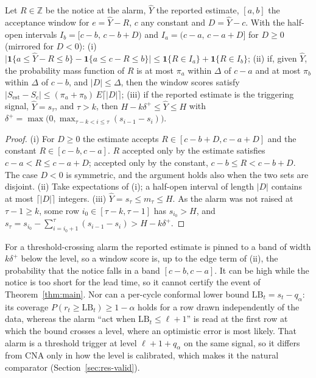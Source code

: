 \begin{proposition}\label{prop:window}
Let $R\in\mathbb Z$ be the notice at the alarm, $\hat Y$ the reported estimate, $[a,b]$ the acceptance window for $e=\hat Y-R$, $c$ any constant and $D=\hat Y-c$. With the half-open intervals $I_b=[c-b,\,c-b+D)$ and $I_a=(c-a,\,c-a+D]$ for $D\ge0$ (mirrored for $D<0$):
(i) $\bigl|\mathbf 1\{a\le\hat Y-R\le b\}-\mathbf 1\{a\le c-R\le b\}\bigr|\le \mathbf 1\{R\in I_a\}+\mathbf 1\{R\in I_b\}$;
(ii) if, given $\hat Y$, the probability mass function of $R$ is at most $\pi_a$ within $\Delta$ of $c-a$ and at most $\pi_b$ within $\Delta$ of $c-b$, and $|D|\le\Delta$, then the window scores satisfy $|S_{\text{est}}-S_c|\le(\pi_a+\pi_b)\,E\lceil|D|\rceil$;
(iii) if the reported estimate is the triggering signal, $\hat Y=s_\tau$, and $\tau>k$, then $H-k\delta^+\le\hat Y\le H$ with $\delta^+=\max\bigl(0,\max_{\tau-k<i\le\tau}(s_{i-1}-s_i)\bigr)$.
\end{proposition}
\begin{proof}
(i) For $D\ge0$ the estimate accepts $R\in[c-b+D,c-a+D]$ and the constant $R\in[c-b,c-a]$. $R$ accepted only by the estimate satisfies $c-a<R\le c-a+D$; accepted only by the constant, $c-b\le R<c-b+D$. The case $D<0$ is symmetric, and the argument holds also when the two sets are disjoint. (ii) Take expectations of (i); a half-open interval of length $|D|$ contains at most $\lceil|D|\rceil$ integers. (iii) $\hat Y=s_\tau\le m_\tau\le H$. As the alarm was not raised at $\tau-1\ge k$, some row $i_0\in[\tau-k,\tau-1]$ has $s_{i_0}>H$, and $s_\tau=s_{i_0}-\sum_{i=i_0+1}^{\tau}(s_{i-1}-s_i)>H-k\delta^+$.
\end{proof}

For a threshold-crossing alarm the reported estimate is pinned to a band of width $k\delta^+$ below the level, so a window score is, up to the edge term of (ii), the probability that the notice falls in a band $[c-b,c-a]$. It can be high while the notice is too short for the lead time, so it cannot certify the event of Theorem~\ref{thm:main}. Nor can a per-cycle conformal lower bound $\mathrm{LB}_t=s_t-q_\alpha$: its coverage $P(r_t\ge\mathrm{LB}_t)\ge1-\alpha$ holds for a row drawn independently of the data, whereas the alarm ``act when $\mathrm{LB}_t\le\ell+1$'' is read at the first row at which the bound crosses a level, where an optimistic error is most likely. That alarm is a threshold trigger at level $\ell+1+q_\alpha$ on the same signal, so it differs from CNA only in how the level is calibrated, which makes it the natural comparator (Section~\ref{sec:res-valid}).
